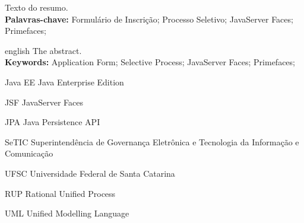 \documentclass[
  10.5pt,				  %
	openright,			%
	twoside,			  %
  a5paper,
  chapter=TITLE,	%
	section=TITLE,	%
  hyphens,        %
	english,        %
	brazil          %
]{abntex2}
\begin{document}

\begin{resumo}
Texto do resumo.
\vspace{\onelineskip} \\
\noindent \textbf{Palavras-chave:} Formulário de Inscrição; Processo Seletivo; JavaServer Faces; Primefaces;
\end{resumo}
\begin{resumo}[Abstract]
\begin{otherlanguage*}{english}
The abstract.
\vspace{\onelineskip} \\
\noindent \textbf{Keywords:} Application Form; Selective Process; JavaServer Faces; Primefaces;
\end{otherlanguage*}
\end{resumo}




\begin{siglas}
  \item[Java EE] Java Enterprise Edition
  \item[JSF]     JavaServer Faces
  \item[JPA]     Java Persistence API
  \item[SeTIC]   Superintendência de Governança Eletrônica e Tecnologia da Informação e Comunicação
  \item[UFSC]    Universidade Federal de Santa Catarina
  \item[RUP]     Rational Unified Process
  \item[UML]     Unified Modelling Language
\end{siglas}



\tableofcontents*
\cleardoublepage



\textual%
\end{document}
